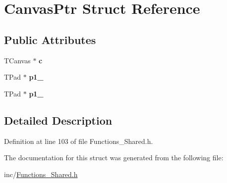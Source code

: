 \hypertarget{structCanvasPtr}{}\section{Canvas\+Ptr Struct Reference}
\label{structCanvasPtr}
\subsection*{Public Attributes}
\begin{DoxyCompactItemize}
\item 
\hypertarget{structCanvasPtr_a43aa501c472e73caeb5c1c44d141c43a}{}T\+Canvas $\ast$ {\bfseries c}\label{structCanvasPtr_a43aa501c472e73caeb5c1c44d141c43a}

\item 
\hypertarget{structCanvasPtr_a6f9aae5eca044d2c731db354cb38c9c6}{}T\+Pad $\ast$ {\bfseries p1\+\_}\label{structCanvasPtr_a6f9aae5eca044d2c731db354cb38c9c6}

\item 
\hypertarget{structCanvasPtr_a49f2e1a75298107884977f77641e45f8}{}T\+Pad $\ast$ {\bfseries p1\+\_}\label{structCanvasPtr_a49f2e1a75298107884977f77641e45f8}

\end{DoxyCompactItemize}


\subsection{Detailed Description}


Definition at line 103 of file Functions\+\_\+\+Shared.\+h.



The documentation for this struct was generated from the following file\+:\begin{DoxyCompactItemize}
\item 
inc/\hyperlink{Functions__Shared_8h}{Functions\+\_\+\+Shared.\+h}\end{DoxyCompactItemize}
